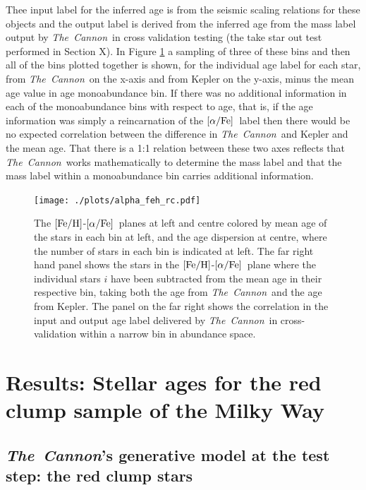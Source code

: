 \documentclass[12pt, preprint]{aastex}
\newcommand{\project}[1]{\textsl{#1}}
\newcommand{\tc}{\project{The~Cannon}}
\newcommand{\feh}{\mbox{$\rm [Fe/H]$}}
\newcommand{\alphafe}{\mbox{$\rm [\alpha/Fe]$}}
\begin{document}
Thee input label for the inferred age is from the seismic scaling relations for these objects and the output label is derived from the inferred age from the mass label output by \tc\ in cross validation testing (the take star out test performed in Section X). In Figure \ref{fig:alphabins} a sampling of three of these bins and then all of the bins plotted together is shown, for the individual age label for each star, from \tc\ on the x-axis and from Kepler on the y-axis, minus the mean age value in age monoabundance bin. If there was no additional information in each of the monoabundance bins with respect to age, that is, if the age information was simply a reincarnation of the \alphafe\ label then there would be no expected correlation between the difference in \tc\ and Kepler and the mean age. That there is a 1:1 relation between these two axes reflects that \tc\ works mathematically to determine the mass label and that the mass label within a monoabundance bin carries additional information.

\begin{figure}[h!]
\centering
 \texttt{[image: ./plots/alpha\_feh\_rc.pdf]}
    \caption{The \feh-\alphafe\ planes at left and centre colored by mean age of the stars in each bin at left,  and the age dispersion at centre, where the number of stars in each bin is indicated at left. The far right hand panel shows the stars in the \feh-\alphafe\ plane where the individual stars $i$ have been subtracted from the mean age in their respective bin, taking both the age from \tc\ and the age from Kepler. The panel on the far right shows the correlation in the input and output age label delivered by \tc\ in cross-validation within a narrow bin in abundance space.  }
\label{fig:alphabins}
\end{figure}

\section{Results: Stellar ages for the red clump sample of the Milky Way}

\subsection{\tc's generative model at the test step: the red clump stars}
\end{document}

